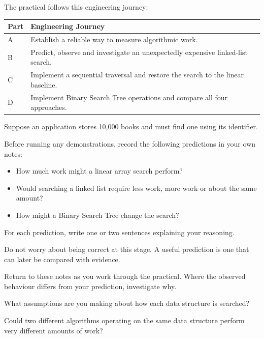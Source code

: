 \documentclass{csc2059practical}
\begin{document}
The practical follows this engineering journey:

\begin{center}
\begin{tabular}{p{} p{}}
\toprule
\textbf{Part} & \textbf{Engineering Journey} \\
\midrule
A & Establish a reliable way to measure algorithmic work. \\
B & Predict, observe and investigate an unexpectedly expensive linked-list
    search. \\
C & Implement a sequential traversal and restore the search to the linear
    baseline. \\
D & Implement Binary Search Tree operations and compare all four approaches. \\
\bottomrule
\end{tabular}
\end{center}



Suppose an application stores 10,000 books and must find one using its
identifier.

Before running any demonstrations, record the following predictions in your own
notes:

\begin{itemize}
    \item How much work might a linear array search perform?
    \item Would searching a linked list require less work, more work or about
          the same amount?
    \item How might a Binary Search Tree change the search?
\end{itemize}

For each prediction, write one or two sentences explaining your reasoning.

Do not worry about being correct at this stage. A useful prediction is one that
can later be compared with evidence.

Return to these notes as you work through the practical. Where the observed
behaviour differs from your prediction, investigate why.

\begin{reflectionbox}
What assumptions are you making about how each data structure is searched?

Could two different algorithms operating on the same data structure perform
very different amounts of work?
\end{reflectionbox}
\end{document}

